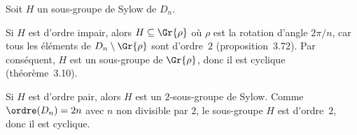 Soit $H$ un sous-groupe de Sylow de $D_n$.

Si $H$ est d'ordre impair, alors $H\subseteq\Gr{\rho}$ où $\rho$ est la rotation d'angle $2\pi/n$, car tous les éléments de $D_n\setminus\Gr{\rho}$ sont d'ordre~$2$ (proposition~3.72).
Par conséquent, $H$ est un sous-groupe de $\Gr{\rho}$, donc il est cyclique (théorème~3.10).

Si $H$ est d'ordre pair, alors $H$ est un $2$-sous-groupe de Sylow.
Comme $\ordre(D_n) = 2n$ avec $n$ non divisible par $2$, le sous-groupe $H$ est d'ordre~$2$, donc il est cyclique.
